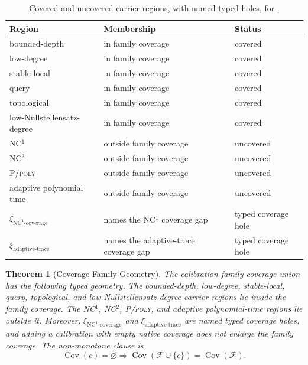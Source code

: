 \documentclass[11pt]{article}
\newcommand{\TypedHole}{typed coverage hole}
\newcommand{\xiNCone}{\xi_{\text{NC}^{1}\text{-coverage}}}
\newcommand{\xiAdaptive}{\xi_{\text{adaptive-trace}}}
\newtheorem{theorem}{Theorem}[section]
\theoremstyle{definition}
\begin{document}
\begin{table}[H]
  \centering
  \caption{Covered and uncovered carrier regions, with named typed holes, for .}
  \label{tab:coverage-regions}
  \small
  \begin{tabularx}{\textwidth}{@{}>{\raggedright\arraybackslash}p{}>{\raggedright\arraybackslash}X>{\raggedright\arraybackslash}p{}@{}}
    \toprule
    Region & Membership & Status \\
    \midrule
    bounded-depth & in family coverage & covered \\
    low-degree & in family coverage & covered \\
    stable-local & in family coverage & covered \\
    query & in family coverage & covered \\
    topological & in family coverage & covered \\
    low-Nullstellensatz-degree & in family coverage & covered \\
    \textsc{NC}\(^{1}\) & outside family coverage & uncovered \\
    \textsc{NC}\(^{2}\) & outside family coverage & uncovered \\
    \textsc{P/poly} & outside family coverage & uncovered \\
    adaptive polynomial time & outside family coverage & uncovered \\
    \(\xiNCone\) & names the \textsc{NC}\(^{1}\) coverage gap & \TypedHole{} \\
    \(\xiAdaptive\) & names the adaptive-trace coverage gap & \TypedHole{} \\
    \bottomrule
  \end{tabularx}
\end{table}
 
\begin{theorem}[Coverage-Family Geometry]\label{thm:coverage-family-geometry}
The calibration-family coverage union has the following typed geometry.
The bounded-depth, low-degree, stable-local, query, topological, and
low-Nullstellensatz-degree carrier regions lie inside the family
coverage.  The \textsc{NC}\(^{1}\), \textsc{NC}\(^{2}\),
\textsc{P/poly}, and adaptive polynomial-time regions lie outside it.
Moreover, \(\xiNCone\) and \(\xiAdaptive\) are named typed coverage holes,
and adding a calibration with empty native coverage does not enlarge the
family coverage.
The non-monotone clause is
\[
  \operatorname{Cov}(c)=\varnothing
  \Longrightarrow
  \operatorname{Cov}(\mathcal F\cup\{c\})
  =
  \operatorname{Cov}(\mathcal F).
\]
\end{theorem}
\end{document}
